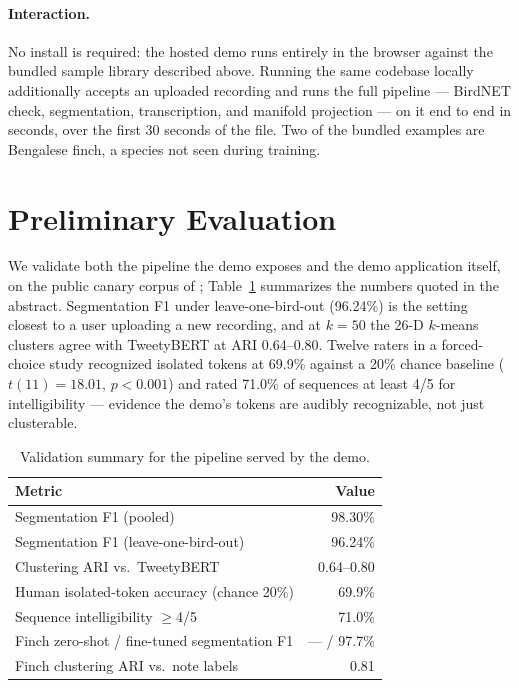 \documentclass[letterpaper]{article} %
\begin{document}
\paragraph{Interaction.} No install is required: the hosted demo runs
entirely in the browser against the bundled sample library described
above. Running the same codebase locally additionally accepts an uploaded
recording and runs the full pipeline --- BirdNET check, segmentation,
transcription, and manifold projection --- on it end to end in seconds, over
the first 30
seconds of the file. Two of the bundled examples are Bengalese finch, a
species not seen during training.

\section{Preliminary Evaluation}
\label{sec:evaluation}
We validate both the pipeline the demo exposes and the demo application
itself, on the public canary corpus of \citet{canary_dataset};
Table~\ref{tab:results} summarizes the numbers quoted in the
abstract. Segmentation F1 under leave-one-bird-out (96.24\%) is the setting
closest to a user uploading a new recording, and at $k{=}50$ the 26-D
$k$-means \citep{lloyd1982} clusters agree with TweetyBERT at ARI 0.64--0.80. Twelve raters
in a forced-choice study recognized isolated tokens at 69.9\% against a
20\% chance baseline ($t(11){=}18.01$, $p{<}0.001$) and rated 71.0\% of
sequences at least 4/5 for intelligibility --- evidence the demo's tokens
are audibly recognizable, not just clusterable.

\begin{table}[t]
\centering
\small
\setlength{\tabcolsep}{4pt}
\renewcommand{\arraystretch}{0.92}
\begin{tabular}{lr}
\toprule
Metric & Value \\
\midrule
Segmentation F1 (pooled) & 98.30\% \\
Segmentation F1 (leave-one-bird-out) & 96.24\% \\
Clustering ARI vs.\ TweetyBERT & 0.64--0.80 \\
Human isolated-token accuracy (chance 20\%) & 69.9\% \\
Sequence intelligibility $\geq$4/5 & 71.0\% \\
Finch zero-shot / fine-tuned segmentation F1 & --- / 97.7\% \\
Finch clustering ARI vs.\ note labels & 0.81 \\
\bottomrule
\end{tabular}
\caption{Validation summary for the pipeline served by the demo.}
\label{tab:results}
\end{table}
\end{document}
